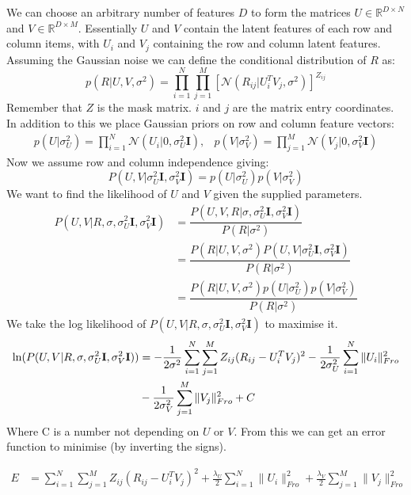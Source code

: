 We can choose an arbitrary number of features $D$ to form the matrices $U \in \mathbb{R}^{D\times N}$ and $V \in \mathbb{R}^{D\times M}$. Essentially $U$ and $V$ contain the latent features of each row and column items, with $U_i$ and $V_j$ containing the row and column latent features. Assuming the Gaussian noise we can define the conditional distribution of $R$ as:
\begin{equation}
p(R|U,V,\sigma^2) = \prod_{i=1}^{N} \prod_{j=1}^{M} \left[\mathcal{N}(R_{ij}|U_i^T V_j,\sigma^2)\right]^{Z_{ij}}
\end{equation}
Remember that $Z$ is the mask matrix. $i$ and $j$ are the matrix entry coordinates. In addition to this we place Gaussian priors on row and column feature vectors:
\begin{eqnarray}
p(U|\sigma_U^2) = \prod_{i=1}^{N} \mathcal{N}(U_i|0,\sigma_U^2\mathbf{I}), &   p(V|\sigma_V^2) = \prod_{j=1}^{M} \mathcal{N}(V_j|0,\sigma_V^2\mathbf{I})
\end{eqnarray}
Now we assume row and column independence giving:
\begin{equation*}
P(U,V|\sigma_U^2\mathbf{I},\sigma_V^2\mathbf{I}) = p(U|\sigma_U^2)  p(V|\sigma_V^2)
\end{equation*}
We want to find the likelihood of $U$ and $V$ given the supplied parameters.
\begin{align*}
P(U,V|R,\sigma,\sigma_U^2\mathbf{I},\sigma_V^2\mathbf{I}) &= \dfrac{P(U,V,R|\sigma,\sigma_U^2\mathbf{I},\sigma_V^2\mathbf{I})}{P(R|\sigma^2)} \\
&= \dfrac{P(R|U,V,\sigma^2)P(U,V|\sigma_U^2\mathbf{I},\sigma_V^2\mathbf{I})}{P(R|\sigma^2)} \\
&= \dfrac{P(R|U,V,\sigma^2) p(U|\sigma_U^2)  p(V|\sigma_V^2)}{P(R|\sigma^2)}
\end{align*}
 We take the log likelihood of $P(U,V|R,\sigma,\sigma_U^2\mathbf{I},\sigma_V^2\mathbf{I})$ to maximise it.
\begin{align}
\ln (P(U,V|R,\sigma,\sigma_U^2\mathbf{I},\sigma_V^2\mathbf{I})) &= - \frac{1}{2 \sigma^2} \sum_{i=1}^{N} \sum_{j=1}^{M} Z_{ij}(R_{ij}-U_i^TV_j)^2 - \frac{1}{2\sigma_U^2} \sum_{i=1}^{N} \|U_i\|_{Fro}^2 
\notag \\ &  - \frac{1}{2\sigma_V^2} \sum_{j=1}^{M} \|V_j\|_{Fro}^2 + C \label{eq:pmf_ml_log}
\end{align}
Where C is a number not depending on $U$ or $V$. From this we can get an error function to minimise (by inverting the signs).

\begin{align}
E&=\sum_{i=1}^{N} \sum_{j=1}^{M} Z_{ij}(R_{ij}-U_i^TV_j)^2 + \frac{\lambda_U}{2}\sum_{i=1}^{N} \|U_i\|_{Fro}^2 
+ \frac{\lambda_V}{2} \sum_{j=1}^{M} \|V_j\|_{Fro}^2
\label{eq:pmf_err_func}
\end{align}

